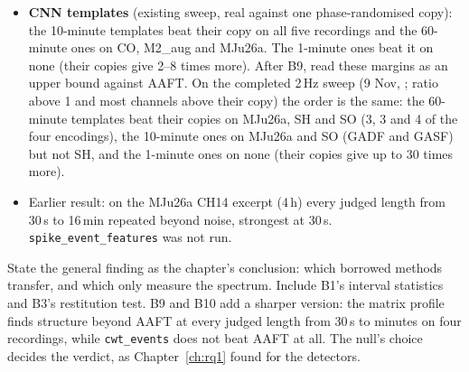 \begin{instructions}
\begin{itemize}
\begin{itemize}
                (channel 0, from the middle). The lengths that repeat beyond AAFT are:
                \begin{itemize}
                  \item M2\_aug 30\,s--16.3\,min, M2\_concat 30\,s--4.4\,min, CO 30\,s--25.1\,min and LM
                        30\,s--16.3\,min;
                  \item none on MJu26a, whose span is a steady oscillation of about 20\,min that AAFT keeps.
                \end{itemize}
                As in W3, the cleared lengths form one band and the strongest gap is at the shortest length, so no
                window is preferred. The 38.8\,min and 1\,h rungs cannot be judged on 8\,h.
          \item \textbf{CNN templates} (existing sweep, real against one phase-randomised copy): the 10-minute
                templates beat their copy on all five recordings and the 60-minute ones on CO, M2\_aug and MJu26a.
                The 1-minute ones beat it on none (their copies give 2--8 times more). After B9, read these margins as
                an upper bound against AAFT. On the completed 2\,Hz sweep (9 Nov,
                ; ratio above 1 and most channels above
                their copy) the order is the same: the 60-minute templates beat their copies on MJu26a, SH and SO (3, 3
                and 4 of the four encodings), the 10-minute ones on MJu26a and SO (GADF and GASF) but not SH, and the
                1-minute ones on none (their copies give up to 30 times more).
          \item Earlier result: on the MJu26a CH14 excerpt (4\,h) every judged length from 30\,s to 16\,min repeated beyond noise,
                strongest at 30\,s. \texttt{spike\_event\_features} was not run.
        \end{itemize}
\end{itemize}
State the general finding as the chapter's conclusion: which borrowed methods transfer, and which only measure the
spectrum. Include B1's interval statistics and B3's restitution test. B9 and B10 add a sharper version: the matrix profile finds
structure beyond AAFT at every judged length from 30\,s to minutes on four recordings, while \texttt{cwt\_events} does
not beat AAFT at all. The null's choice decides the verdict, as Chapter~\ref{ch:rq1} found for the detectors.
\end{instructions}

